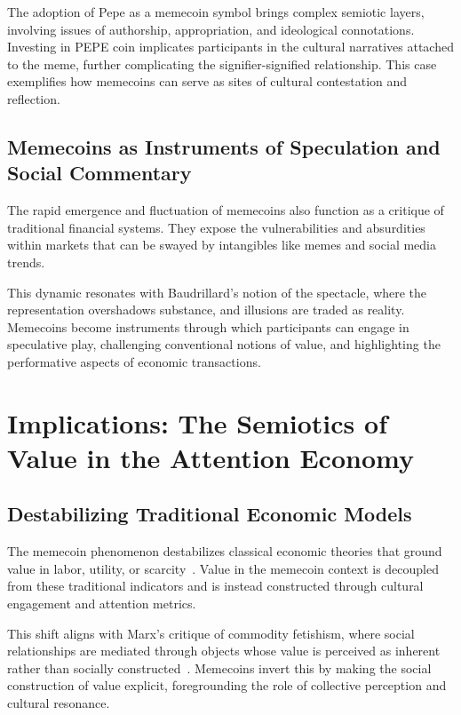 \documentclass[a4paper,12pt]{article}
\begin{document}
The adoption of Pepe as a memecoin symbol brings complex semiotic layers, involving issues of authorship, appropriation, and ideological connotations. Investing in PEPE coin implicates participants in the cultural narratives attached to the meme, further complicating the signifier-signified relationship. This case exemplifies how memecoins can serve as sites of cultural contestation and reflection.

\subsection{Memecoins as Instruments of Speculation and Social Commentary}

The rapid emergence and fluctuation of memecoins also function as a critique of traditional financial systems. They expose the vulnerabilities and absurdities within markets that can be swayed by intangibles like memes and social media trends.

This dynamic resonates with Baudrillard's notion of the spectacle, where the representation overshadows substance, and illusions are traded as reality. Memecoins become instruments through which participants can engage in speculative play, challenging conventional notions of value, and highlighting the performative aspects of economic transactions.

\section{Implications: The Semiotics of Value in the Attention Economy}

\subsection{Destabilizing Traditional Economic Models}

The memecoin phenomenon destabilizes classical economic theories that ground value in labor, utility, or scarcity~\cite{smith1776wealth}. Value in the memecoin context is decoupled from these traditional indicators and is instead constructed through cultural engagement and attention metrics.

This shift aligns with Marx's critique of commodity fetishism, where social relationships are mediated through objects whose value is perceived as inherent rather than socially constructed~\cite{marx1867capital}. Memecoins invert this by making the social construction of value explicit, foregrounding the role of collective perception and cultural resonance.
\end{document}
